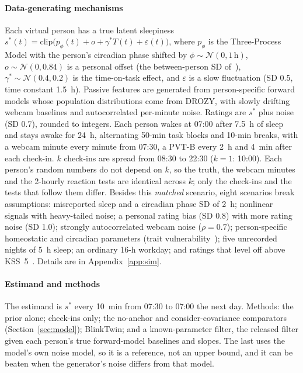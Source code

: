 \paragraph*{Data-generating mechanisms} Each virtual person has a true latent sleepiness $s^*(t) = \mathrm{clip}\big(p_\phi(t) + o + \gamma^* T(t) + \varepsilon(t)\big)$, where $p_\phi$ is the Three-Process Model with the person's circadian phase shifted by $\phi \sim \mathcal{N}(0, 1\,\mathrm{h})$, $o \sim \mathcal{N}(0, 0.84)$ is a personal offset (the between-person SD of~\cite{ingre2014validating}), $\gamma^* \sim \mathcal{N}(0.4, 0.2)$ is the time-on-task effect, and $\varepsilon$ is a slow fluctuation (SD 0.5, time constant 1.5~h). Passive features are generated from person-specific forward models whose population distributions come from DROZY, with slowly drifting webcam baselines and autocorrelated per-minute noise. Ratings are $s^*$ plus noise (SD 0.7), rounded to integers. Each person wakes at 07:00 after 7.5~h of sleep and stays awake for 24~h, alternating 50-min task blocks and 10-min breaks, with a webcam minute every minute from 07:30, a PVT-B every 2~h and 4~min after each check-in. $k$ check-ins are spread from 08:30 to 22:30 ($k = 1$: 10:00). Each person's random numbers do not depend on $k$, so the truth, the webcam minutes and the 2-hourly reaction tests are identical across $k$; only the check-ins and the tests that follow them differ. Besides this \emph{matched} scenario, eight scenarios break assumptions: misreported sleep and a circadian phase SD of 2~h; nonlinear signals with heavy-tailed noise; a personal rating bias (SD 0.8) with more rating noise (SD 1.0); strongly autocorrelated webcam noise ($\rho = 0.7$); person-specific homeostatic and circadian parameters (trait vulnerability~\cite{vandongen2004systematic}); five unrecorded nights of 5~h sleep; an ordinary 16-h workday; and ratings that level off above KSS~5~\cite{vandongen2003cumulative}. Details are in Appendix~\ref{app:sim}.

\paragraph*{Estimand and methods} The estimand is $s^*$ every 10~min from 07:30 to 07:00 the next day. Methods: the prior alone; check-ins only; the no-anchor and consider-covariance comparators (Section~\ref{sec:model}); BlinkTwin; and a known-parameter filter, the released filter given each person's true forward-model baselines and slopes. The last uses the model's own noise model, so it is a reference, not an upper bound, and it can be beaten when the generator's noise differs from that model.

